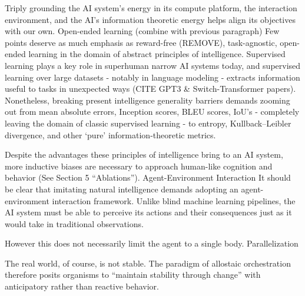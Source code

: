Triply grounding the AI system’s energy in its compute platform, the interaction environment, and the AI's information theoretic energy helps align its objectives with our own.
Open-ended learning (combine with previous paragraph)
Few points deserve as much emphasis as reward-free (REMOVE), task-agnostic, open-ended learning in the domain of abstract principles of intelligence. Supervised learning plays a key role in superhuman narrow AI systems today, and supervised learning over large datasets - notably in language modeling - extracts information useful to tasks in unexpected ways (CITE GPT3 \& Switch-Transformer papers). Nonetheless, breaking present intelligence generality barriers demands zooming out from mean absolute errors, Inception scores, BLEU scores, IoU’s - completely leaving the domain of classic supervised learning - to entropy, Kullback–Leibler divergence, and other ‘pure’ information-theoretic metrics.

Despite the advantages these principles of intelligence bring to an AI system, more inductive biases are necessary to approach human-like cognition and behavior (See Section 5 “Ablations”).
Agent-Environment Interaction
It should be clear that imitating natural intelligence demands adopting an agent-environment interaction framework. Unlike blind machine learning pipelines, the AI system must be able to perceive its actions and their consequences just as it would take in traditional observations. 

However this does not necessarily limit the agent to a single body. Parallelization

The real world, of course, is not stable. The paradigm of allostaic orchestration therefore posits organisms to ``maintain stability through change'' with anticipatory rather than reactive behavior.  
